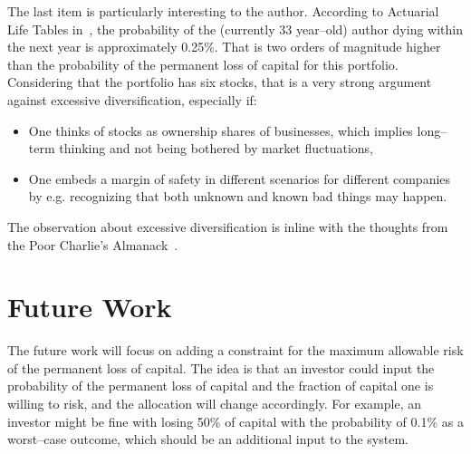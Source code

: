 \documentclass{article}
\begin{document}
\noindent The last item is particularly interesting to the author. According to
Actuarial Life Tables in~\cite{lifeTables}, the probability of the (currently 33
year--old) author dying within the next year is approximately 0.25\%. That is
two orders of magnitude higher than the probability of the permanent loss of
capital for this portfolio. Considering that the portfolio has six stocks, that
is a very strong argument against excessive diversification, especially if:
\begin{itemize}
    \item One thinks of stocks as ownership shares of businesses, which implies
    long--term thinking and not being bothered by market fluctuations, 
    \item One embeds a margin of safety in different scenarios for different
    companies by e.g. recognizing that both unknown and known bad things may
    happen.
\end{itemize}

\noindent The observation about excessive diversification is inline with the
thoughts from the Poor Charlie's Almanack~\cite{almanack}.

\section{Future Work}
\label{sec:futureWork}

\noindent The future work will focus on adding a constraint for the maximum
allowable risk of the permanent loss of capital. The idea is that an investor
could input the probability of the permanent loss of capital and the fraction of
capital one is willing to risk, and the allocation will change accordingly. For
example, an investor might be fine with losing 50\% of capital with the
probability of 0.1\% as a worst--case outcome, which should be an additional
input to the system.

\clearpage



\end{document}
